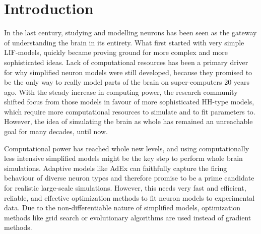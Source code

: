 \section{Introduction}
\label{ch:introduction}

In the last century, studying and modelling neurons has been seen as the gateway of understanding the brain in its entirety.
What first started with very simple \gls{LIF}-models, quickly became proving ground for more complex and more sophisticated ideas.
Lack of computational resources has been a primary driver for why simplified neuron models were still developed, because they promised to be the only way to really model parts of the brain on super-computers 20 years ago.
With the steady increase in computing power, the research community shifted focus from those models in favour of more sophisticated \gls{HH}-type models, which require more computational resources to simulate and to fit parameters to.
However, the idea of simulating the brain as whole has remained an unreachable goal for many decades, until now.

Computational power has reached whole new levels, and using computationally less intensive simplified models might be the key step to perform whole brain simulations.
Adaptive models like \gls{AdEx} can faithfully capture the firing behaviour of diverse neuron types and therefore promise to be a prime candidate for realistic large-scale simulations.
However, this needs very fast and efficient, reliable, and effective optimization methods to fit neuron models to experimental data.
Due to the non-differentiable nature of simplified models, optimization methods like grid search or evolutionary algorithms are used instead of gradient methods.

